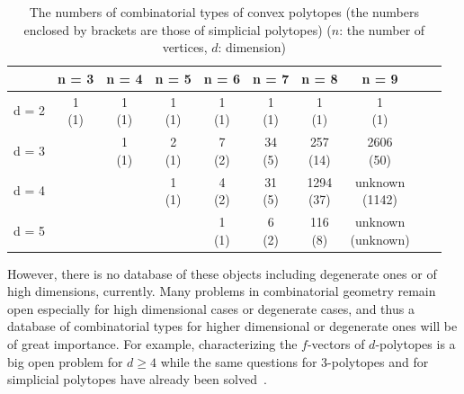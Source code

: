\documentclass{article}
\begin{document}
\begin{table}[h]
\begin{center}
\scalebox{0.8}
{
\begin{tabular}{c | c | c | c | c | c | c | c | c | c |}
        & n = 3 & n = 4 & n = 5 & n = 6 & n = 7 & n = 8 & n = 9 \\
 \hline
 d = 2  & \shortstack{1 \\ (1)}     &  \shortstack{1 \\ (1)}    &  \shortstack{1 \\ (1)}    &  \shortstack{1 \\ (1)}    &   \shortstack{1 \\ (1)}   &  \shortstack{1 \\ (1)}    &   \shortstack{1 \\ (1)}   \\
 \hline 
 d = 3  &       &  \shortstack{1 \\ (1)}    &  \shortstack{2 \\ (1)}    &   \shortstack{7 \\ (2)}   &   \shortstack{34 \\ (5)}  & \shortstack{257 \\ (14)}   & \shortstack{2606 \\ (50)} \\
 \hline
 d = 4  &       &       &  \shortstack{1 \\ (1)}    &   \shortstack{4 \\ (2)}   &  \shortstack{31 \\ (5)}   & \shortstack{1294 \\ (37)} & \shortstack{unknown \\ (1142)} \\
 \hline
 d = 5  &       &       &        &  \shortstack{1 \\ (1)}   &  \shortstack{6 \\ (2)}    & \shortstack{116 \\ (8)}   & \shortstack{unknown \\ (unknown)} \\
 \hline
\end{tabular}
}
\end{center}
\caption{The numbers of combinatorial types of convex polytopes (the numbers enclosed by brackets are those of simplicial polytopes) ($n$: the number of vertices, $d$: dimension)
\cite{ABS80,AS85,G03,GS67}}
\label{existing2}
\end{table} 
However, there is no database of these objects including degenerate ones or 
of high dimensions, currently.
Many problems in combinatorial geometry remain open especially for high dimensional cases or degenerate cases,
and thus a database of combinatorial types for higher dimensional or degenerate ones will be of great importance.
For example, characterizing the $f$-vectors of $d$-polytopes is a big open problem for $d \geq 4$
while the same questions for 3-polytopes and for simplicial polytopes have already been solved~\cite{S1906,BL81,S80}.
\end{document}
